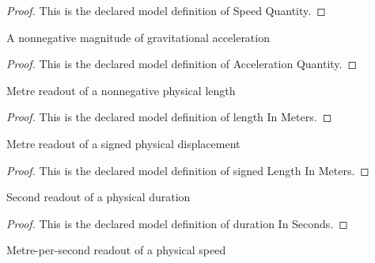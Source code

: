 \begin{proof}
  This is the declared model definition of Speed Quantity.
\end{proof}
\begin{definition}
  \label{def:physics:phyx-mini-0752:phyxminiproblems-problemphyxmini0752-accelerationquantity}
  A nonnegative magnitude of gravitational acceleration
\end{definition}
\begin{proof}
  This is the declared model definition of Acceleration Quantity.
\end{proof}
\begin{definition}
  \label{def:physics:phyx-mini-0752:phyxminiproblems-problemphyxmini0752-lengthinmeters}
  Metre readout of a nonnegative physical length
\end{definition}
\begin{proof}
  This is the declared model definition of length In Meters.
\end{proof}
\begin{definition}
  \label{def:physics:phyx-mini-0752:phyxminiproblems-problemphyxmini0752-signedlengthinmeters}
  Metre readout of a signed physical displacement
\end{definition}
\begin{proof}
  This is the declared model definition of signed Length In Meters.
\end{proof}
\begin{definition}
  \label{def:physics:phyx-mini-0752:phyxminiproblems-problemphyxmini0752-durationinseconds}
  Second readout of a physical duration
\end{definition}
\begin{proof}
  This is the declared model definition of duration In Seconds.
\end{proof}
\begin{definition}
  \label{def:physics:phyx-mini-0752:phyxminiproblems-problemphyxmini0752-speedinmeterspersecond}
  Metre-per-second readout of a physical speed
\end{definition}
